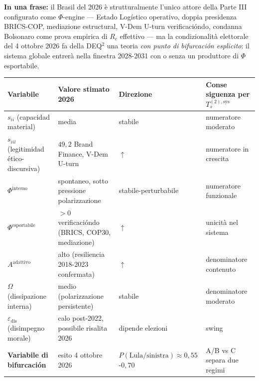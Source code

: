 \Proved{} \textbf{In una frase:} il Brasil del 2026 è strutturalmente
l'unico attore della Parte III configurato come \(\Phi\)-engine ---
Estado Logístico operativo, doppia presidenza BRICS-COP, mediazione
estructural, V-Dem U-turn verificacióndo, condanna Bolsonaro come prova
empirica di \(R_c\) effettivo --- ma la condizionalità elettorale del 4
ottobre 2026 fa della DEQ$^2$ una teoria \emph{con punto di bifurcación
esplicito}: il sistema globale entrerà nella finestra 2028-2031 con o
senza un produttore di \(\Phi\) esportabile.

{\def\LTcaptype{none} %
{\small\begin{longtable}[]{@{}
  >{\raggedright\arraybackslash}p{}
  >{\raggedright\arraybackslash}p{}
  >{\raggedright\arraybackslash}p{}
  >{\raggedright\arraybackslash}p{}@{}}
\toprule\noalign{}
\begin{minipage}[b]{\linewidth}\raggedright
Variabile
\end{minipage} & \begin{minipage}[b]{\linewidth}\raggedright
Valore stimato 2026
\end{minipage} & \begin{minipage}[b]{\linewidth}\raggedright
Direzione
\end{minipage} & \begin{minipage}[b]{\linewidth}\raggedright
Conse siguenza per \(T_s^{(2),\text{sys}}\)
\end{minipage} \\
\midrule\noalign{}
\endhead
\bottomrule\noalign{}
\endlastfoot
\(s_{ii}\) (capacidad material) & media & stabile & numeratore
moderato \\
\(s_{iii}\) (legitimidad ético-discursiva) & \(49{,}2\) Brand Finance,
V-Dem U-turn & \(\uparrow\) & numeratore in crescita \\
\(\Phi^{\text{interno}}\) & spontaneo, sotto pressione polarizzazione &
stabile-perturbabile & numeratore funzionale \\
\(\Phi^{\text{esportabile}}\) & \(> 0\) verificacióndo (BRICS, COP30,
mediazione) & \(\uparrow\) & unicità nel sistema \\
\(A^{\text{adattivo}}\) & alto (resiliencia 2018-2023 confermata) &
\(\uparrow\) & denominatore contenuto \\
\(\Omega\) (dissipazione interna) & medio (polarizzazione persistente) &
stabile & denominatore moderato \\
\(\varepsilon_{\text{dis}}\) (disimpegno morale) & calo post-2022,
possibile risalita 2026 & dipende elezioni & swing \\
\textbf{Variabile di bifurcación} & esito 4 ottobre 2026 &
\(P(\text{Lula/sinistra}) \approx 0{,}55\)-\(0{,}70\) & A/B vs C separa
due regimi \\
\end{longtable}}
}

